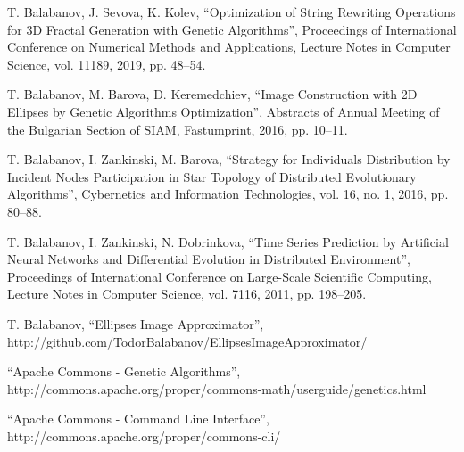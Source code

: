 \documentclass[conference]{IEEEtran}
\begin{document}
\begin{thebibliography}{00}
 T. Balabanov, J. Sevova, K. Kolev, ``Optimization of String Rewriting Operations for 3D Fractal Generation with Genetic Algorithms'', Proceedings of International Conference on Numerical Methods and Applications, Lecture Notes in Computer Science, vol. 11189, 2019, pp. 48--54.

 T. Balabanov, M. Barova, D. Keremedchiev, ``Image Construction with 2D Ellipses by Genetic Algorithms Optimization'', Abstracts of Annual Meeting of the Bulgarian Section of SIAM, Fastumprint, 2016, pp. 10--11.

 T. Balabanov, I. Zankinski, M. Barova, ``Strategy for Individuals Distribution by Incident Nodes Participation in Star Topology of Distributed Evolutionary Algorithms'', Cybernetics and Information Technologies, vol. 16, no. 1, 2016, pp. 80--88.

 T. Balabanov, I. Zankinski, N. Dobrinkova, ``Time Series Prediction by Artificial Neural Networks and Differential Evolution in Distributed Environment'', Proceedings of International Conference on Large-Scale Scientific Computing, Lecture Notes in Computer Science, vol. 7116, 2011, pp. 198--205.

 T. Balabanov, ``Ellipses Image Approximator'', http://github.com/TodorBalabanov/EllipsesImageApproximator/

 ``Apache Commons - Genetic Algorithms'', http://commons.apache.org/proper/commons-math/userguide/genetics.html

 ``Apache Commons - Command Line Interface'', http://commons.apache.org/proper/commons-cli/

\end{thebibliography}
\end{document}
